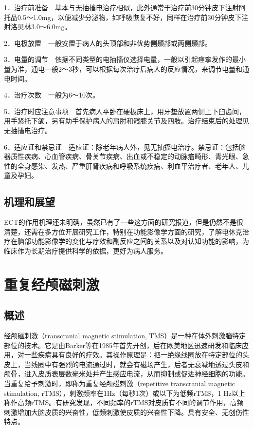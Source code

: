 1．治疗前准备　基本与无抽搐电治疗相似，此外通常于治疗前30分钟皮下注射阿托品0.5～1.0mg，以便减少分泌物，如呼吸恢复不好，同样在治疗前30分钟皮下注射洛贝林3.0～6.0mg。

2．电极放置　一般安置于病人的头顶部和非优势侧颞部或两侧颞部。

3．电量的调节　依据不同类型的电抽搐仪选择电量，一般以引起痉挛发作的最小量为准，通电一般2～3秒，可以根据每次治疗后病人的反应情况，来调节电量和通电时间。

4．治疗次数　一般为6～10次。

5．治疗时应注意事项　首先病人平卧在硬板床上，用牙垫放置两侧上下臼齿间，用手紧托下颌，另有助手保护病人的肩肘和髋膝关节及四肢。治疗结束后的处理见无抽搐电治疗。

6．适应证和禁忌证　适应证：除老年病人外，见无抽搐电治疗。禁忌证：包括脑器质性疾病、心血管疾病、骨关节疾病、出血或不稳定的动脉瘤畸形、青光眼、急性的全身感染、发热、严重肝肾疾病和呼吸系统疾病、利血平治疗者、老年人、儿童及孕妇。

\subsection{机理和展望}

ECT的作用机理还未明确，虽然已有了一些这方面的研究报道，但是仍然不是很清楚，还需在多方位开展研究工作，特别在功能影像学方面的研究，了解电休克治疗在脑部功能影像学的变化与疗效和副反应之间的关系以及对认知功能的影响，为临床作为长期治疗提供科学的依据，更好为病人服务。


\section{重复经颅磁刺激}

\subsection{概述}

经颅磁刺激（transcranial magnetic stimulation,
TMS）是一种在体外刺激脑特定部位的技术。它是由Barker等在1985年首先开创，后在欧美地区迅速研发和临床应用，对一些疾病具有良好的疗效。其操作原理是：把一绝缘线圈放在特定部位的头皮上，当线圈中有强烈的电流通过时，就会有磁场产生，后者无衰减地透过头皮和颅骨，进入皮质表层数毫米处并产生感应电流，从而抑制或促进神经细胞的功能。当重复给予刺激时，即称为重复经颅磁刺激（repetitive
transcranial magnetic stimulation,
rTMS），刺激频率在1Hz（每秒1次）或以下为低频rTMS，1
Hz以上称作高频rTMS。有研究发现，不同频率的rTMS对皮质有不同的调节作用，高频刺激增加大脑皮质的兴奋性，低频刺激使皮质的兴奋性下降。具有安全、无创伤性特点。

